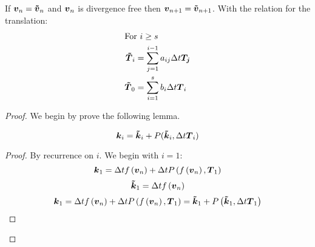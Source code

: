 \begin{theorem}
If ${\boldsymbol {v}}_{n}={\boldsymbol {\tilde{v}}}_{n}$ and ${\boldsymbol {v}}_n$ is divergence free then ${\boldsymbol {v}}_{n+1}={\boldsymbol {\tilde{v}}}_{n+1}$.
With the relation for the translation:
\begin{align}
\intertext{For $i\geq s$}
  {\boldsymbol {\tilde{T}}}_i&=\sum_{j=1}^{i-1}a_{ij}\Delta t {\boldsymbol {T_{j}}}\\
  {\boldsymbol {\tilde{T}}}_0&=\sum_{i=1}^{s}b_{i}\Delta t {\boldsymbol {T}}_{i}
\end{align}

\end{theorem}
\begin{proof}
We begin by prove the following lemma.
\begin{lemma}
\begin{equation}
  {\boldsymbol {k}}_{i}={\boldsymbol {\tilde{k}}}_{i}+P({\boldsymbol {\tilde{k}}}_{i},\Delta t {\boldsymbol {T}}_{i})
\end{equation}
\end{lemma}
\begin{proof}
By recurrence on $i$.
We begin with $i=1$:
\begin{equation}
  {\boldsymbol {k}}_{1}=\Delta tf\left({\boldsymbol {v}}_n\right)+\Delta tP\left(f\left({\boldsymbol {v}}_n\right),{\boldsymbol {T}}_{1}\right)
\end{equation}
\begin{equation}
{\boldsymbol {\tilde{k}}}_{1}=\Delta tf\left({\boldsymbol {{\boldsymbol {v}}}}_n\right)
\end{equation}
\begin{equation}
  {\boldsymbol {k}}_{1}=\Delta t f\left({\boldsymbol {v}}_n\right)+\Delta tP\left(f\left({\boldsymbol {v}}_n\right),{\boldsymbol {T}}_{1}\right)={\boldsymbol {\tilde{k}}}_1+P\left({\boldsymbol {\tilde{k}}}_1,\Delta t {\boldsymbol {T}}_{1}\right)
\end{equation}


\end{proof}
\end{proof}
